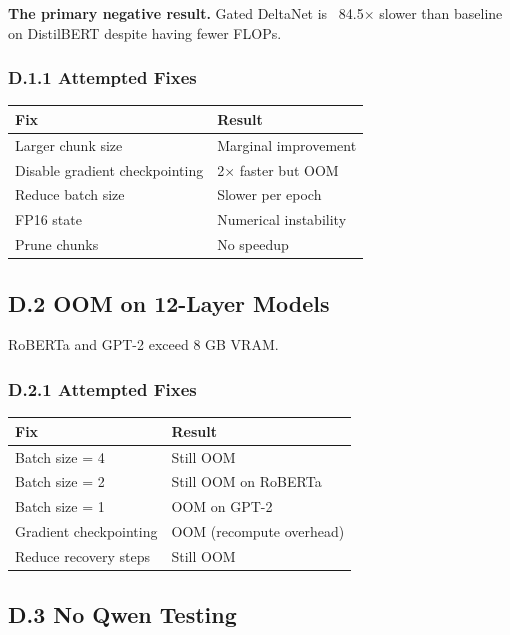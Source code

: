\textbf{The primary negative result.} Gated DeltaNet is ~84.5$\times$ slower 
than baseline on DistilBERT despite having fewer FLOPs.

\subsubsection{D.1.1 Attempted Fixes}

\begin{table}[H]
\centering
\small
\begin{tabular}{ll}
\toprule
\textbf{Fix} & \textbf{Result} \\
\midrule
Larger chunk size & Marginal improvement \\
Disable gradient checkpointing & 2$\times$ faster but OOM \\
Reduce batch size & Slower per epoch \\
FP16 state & Numerical instability \\
Prune chunks & No speedup \\
\bottomrule
\end{tabular}
\end{table}

\subsection{D.2 OOM on 12-Layer Models}

RoBERTa and GPT-2 exceed 8 GB VRAM.

\subsubsection{D.2.1 Attempted Fixes}

\begin{table}[H]
\centering
\small
\begin{tabular}{ll}
\toprule
\textbf{Fix} & \textbf{Result} \\
\midrule
Batch size = 4 & Still OOM \\
Batch size = 2 & Still OOM on RoBERTa \\
Batch size = 1 & OOM on GPT-2 \\
Gradient checkpointing & OOM (recompute overhead) \\
Reduce recovery steps & Still OOM \\
\bottomrule
\end{tabular}
\end{table}

\subsection{D.3 No Qwen Testing}

